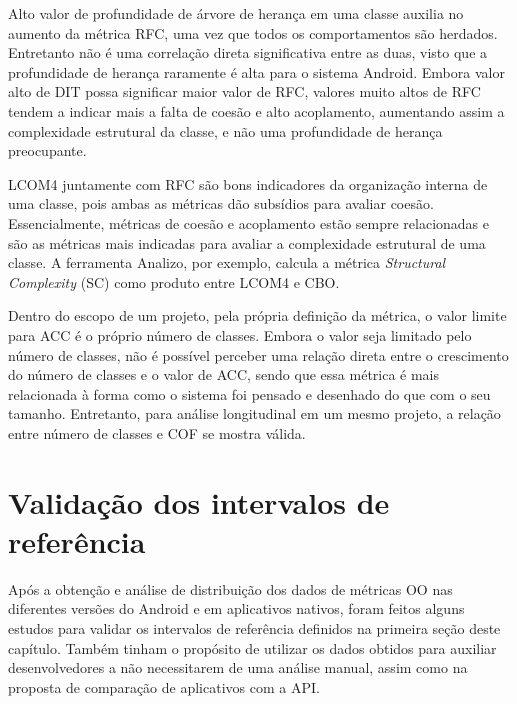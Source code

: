 Alto valor de profundidade de árvore de herança em uma classe auxilia no aumento da métrica RFC, uma vez que todos os comportamentos são herdados. Entretanto não é uma correlação direta significativa entre as duas, visto que a profundidade de herança raramente é alta para o sistema Android. Embora valor alto de DIT possa significar maior valor de RFC, valores muito altos de RFC tendem a indicar mais a falta de coesão e alto acoplamento, aumentando assim a complexidade estrutural da classe, e não uma profundidade de herança preocupante.

LCOM4 juntamente com RFC são bons indicadores da organização interna de uma classe, pois ambas as métricas dão subsídios para avaliar coesão. Essencialmente, métricas de coesão e acoplamento estão sempre relacionadas e são as métricas mais indicadas para avaliar a complexidade estrutural de uma classe. A ferramenta Analizo, por exemplo, calcula a métrica \textit{Structural Complexity} (SC) como produto entre LCOM4 e CBO.


Dentro do escopo de um projeto, pela própria definição da métrica, o valor limite para ACC é o próprio número de classes. Embora o valor seja limitado pelo número de classes, não é possível perceber uma relação direta entre o crescimento do número de classes e o valor de ACC, sendo que essa métrica é mais relacionada à forma como o sistema foi pensado e desenhado do que com o seu tamanho. Entretanto, para análise longitudinal em um mesmo projeto, a relação entre número de classes e COF se mostra válida.

\section{Validação dos intervalos de referência}

Após a obtenção e análise de distribuição dos dados de métricas OO nas diferentes versões do Android e em aplicativos nativos, foram feitos alguns estudos para validar os intervalos de referência definidos na primeira seção deste capítulo. Também tinham o propósito de utilizar os dados obtidos para auxiliar desenvolvedores a não necessitarem de uma análise manual, assim como na proposta de comparação de aplicativos com a API.


